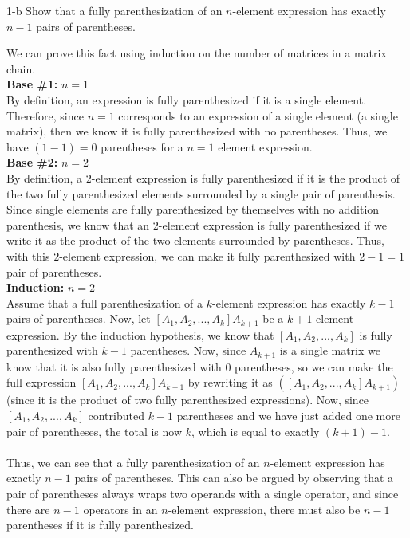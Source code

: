 \documentclass[11pt]{article}
\begin{document}
\begin{prob}{1-b}
Show that a fully parenthesization of an $n$-element expression has exactly $n-1$ pairs of parentheses.
\end{prob}
\begin{sol}
We can prove this fact using induction on the number of matrices in a matrix chain. \\
\textbf{Base \#1:} $n = 1$ \\
By definition, an expression is fully parenthesized if it is a single element. Therefore, since $n=1$ corresponds to an expression of a single element (a single matrix), then we know it is fully parenthesized with no parentheses. Thus, we have $(1-1) = 0$ parentheses for a $n = 1$ element expression.\\
\textbf{Base \#2:} $n = 2$ \\
By definition, a $2$-element expression is fully parenthesized if it is the product of the two fully parenthesized elements surrounded by a single pair of parenthesis. Since single elements are fully parenthesized by themselves with no addition parenthesis, we know that an $2$-element expression is fully parenthesized if we write it as the product of the two elements surrounded by parentheses. Thus, with this $2$-element expression, we can make it fully parenthesized with $2-1 = 1$ pair of parentheses. \\
\textbf{Induction:} $n = 2$ \\
Assume that a full parenthesization of a $k$-element expression has exactly $k-1$ pairs of parentheses. Now, let $[A_1, A_2, ..., A_{k}]A_{k+1}$ be a $k+1$-element expression. By the induction hypothesis, we know that $[A_1, A_2, ..., A_{k}]$ is fully parenthesized with $k-1$ parentheses. Now, since $A_{k+1}$ is a single matrix we know that it is also fully parenthesized with $0$ parentheses, so we can make the full expression $[A_1, A_2, ..., A_{k}]A_{k+1}$ by rewriting it as $([A_1, A_2, ..., A_{k}]A_{k+1})$ (since it is the product of two fully parenthesized expressions). Now, since $[A_1, A_2, ..., A_{k}]$ contributed $k-1$ parentheses and we have just added one more pair of parentheses, the total is now $k$, which is equal to exactly $(k+1) - 1$. \\ \\
Thus, we can see that a fully parenthesization of an $n$-element expression has exactly $n-1$ pairs of parentheses. This can also be argued by observing that a pair of parentheses always wraps two operands with a single operator, and since there are $n-1$ operators in an $n$-element expression, there must also be $n-1$ parentheses if it is fully parenthesized.
\end{sol}
\end{document}
